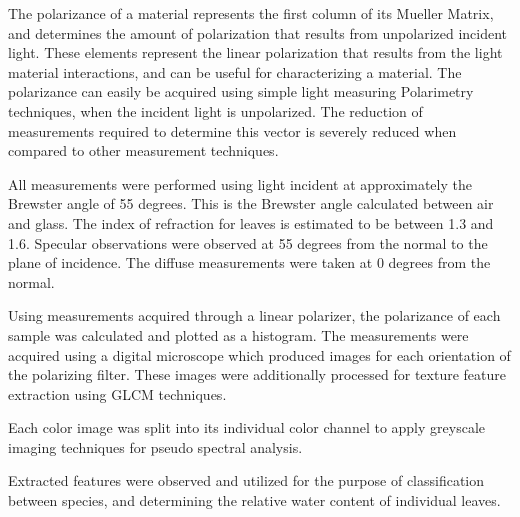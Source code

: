 The polarizance of a material represents the first column of its Mueller Matrix, and determines the amount of polarization that results from unpolarized incident light.  These elements represent the linear polarization that results from the light material interactions, and can be useful for characterizing a material.  The polarizance can easily be acquired using simple light measuring Polarimetry techniques, when the incident light is unpolarized.  The reduction of measurements required to determine this vector is severely reduced when compared to other measurement techniques.

All measurements were performed using light incident at approximately the Brewster angle of 55 degrees.  This is the Brewster angle calculated between air and glass.  The index of refraction for leaves is estimated to be between 1.3 and 1.6. Specular observations were observed at 55 degrees from the normal to the plane of incidence.  The diffuse measurements were taken at 0 degrees from the normal.

Using measurements acquired through a linear polarizer, the polarizance of each sample was calculated and plotted as a histogram.  The measurements were acquired using a digital microscope which produced images for each orientation of the polarizing filter.  These images were additionally processed for texture feature extraction using GLCM techniques.

Each color image was split into its individual color channel to apply greyscale imaging techniques for pseudo spectral analysis.

Extracted features were observed and utilized for the purpose of classification between species, and determining the relative water content of individual leaves.

